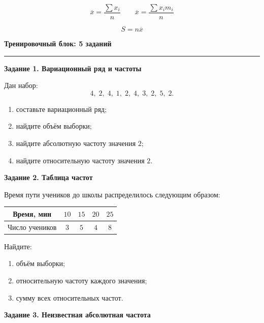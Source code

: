 \documentclass[a4paper,12pt]{article}
\newcommand{\sectiontitle}[1]{%
    \vspace{0.4em}
    {\Large\bfseries\color{darkaccent}#1\par}
    \vspace{0.25em}
    {\color{linegray}\rule{\linewidth}{0.6pt}}
    \vspace{0.7em}
}
\begin{document}
\[
\boxed{
\overline{x}
=
\frac{\sum x_i}{n}
}
\qquad
\boxed{
\overline{x}
=
\frac{\sum x_i m_i}{n}
}
\]

\[
\boxed{
S=n\overline{x}
}
\]


\clearpage

\sectiontitle{Тренировочный блок: 5 заданий}

\textbf{Задание 1. Вариационный ряд и частоты}

Дан набор:
\[
4,\;2,\;4,\;1,\;2,\;4,\;3,\;2,\;5,\;2.
\]

\begin{enumerate}[label=\alph*),leftmargin=9mm,itemsep=1pt]
    \item составьте вариационный ряд;
    \item найдите объём выборки;
    \item найдите абсолютную частоту значения \(2\);
    \item найдите относительную частоту значения \(2\).
\end{enumerate}

\vspace{5mm}

\textbf{Задание 2. Таблица частот}

Время пути учеников до школы распределилось следующим образом:

\begin{center}
\begin{tabular}{ccccc}
\toprule
Время, мин & \(10\) & \(15\) & \(20\) & \(25\) \\
\midrule
Число учеников & \(3\) & \(5\) & \(4\) & \(8\) \\
\bottomrule
\end{tabular}
\end{center}

Найдите:

\begin{enumerate}[label=\alph*),leftmargin=9mm,itemsep=1pt]
    \item объём выборки;
    \item относительную частоту каждого значения;
    \item сумму всех относительных частот.
\end{enumerate}

\vspace{5mm}

\textbf{Задание 3. Неизвестная абсолютная частота}
\end{document}
